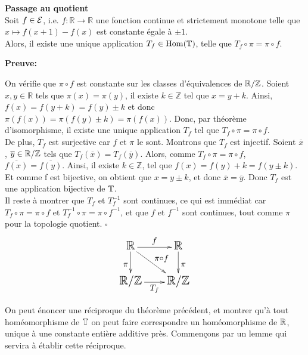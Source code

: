 \begin{theorem}\label{passage au quotient}
	 \textbf{Passage au quotient}\\Soit $f\in {\mathcal{E}}$, i.e. $f: \mathbb{R} \to \mathbb{R}$ une fonction continue et strictement monotone telle que $x\mapsto f(x+1) -f(x)$ est constante égale à $\pm 1$.\\ Alors, il existe une unique application $T_f \in \mathrm{Hom}({\mathbb{T}})$, telle que $T_f\circ \pi = \pi \circ f$.
\end{theorem}

	\textbf{Preuve:}
	\par On vérifie que $\pi \circ f$ est constante sur les classes d'équivalences de ${\mathbb{R}}/\mathbb{Z}$. Soient $x,y \in \mathbb{R}$ tels que $\pi(x)= \pi(y)$, il existe $k \in \mathbb{Z}$ tel que $x= y +k$. Ainsi, $f(x)=f(y+k)=f(y)\pm k$ et donc $\pi(f(x))=\pi(f(y)\pm k)=\pi(f(x))$. Donc, par théorème d'isomorphisme, il existe une unique application $T_f$ tel que $T_f\circ \pi =\pi \circ f$.\\

	De plus, $T_f$ est surjective car $f$ et $\pi$ le sont. Montrons que $T_f$ est injectif. Soient $\overline{x}$, $\overline{y} \in {\mathbb{R}}/\mathbb{Z}$ tels que $T_f(\overline{x})= T_f(\overline{y})$. Alors, comme $T_f\circ \pi =\pi \circ f$, $\overline{f(x)}=\overline{f(y)}$. Ainsi, il existe $k \in \mathbb{Z}$, tel que $f(x)=f(y)+k=f(y\pm k)$. Et comme f est bijective, on obtient que $x=y\pm k$, et donc $\overline{x}=\overline{y}$. Donc $T_f$ est une application bijective de ${\mathbb{T}}$.\\

	Il reste à montrer que $T_f$ et $T_f^{-1}$ sont continues, ce qui est immédiat car $T_f\circ\pi=\pi \circ f$ et $T_f^{-1}\circ\pi=\pi\circ f^{-1}$, et que $f$ et $f^{-1}$ sont continues, tout comme $\pi$ pour la topologie quotient. \hfill $\square$\\

$$\Large\xymatrix{\Rbb \ar[r]^f \ar[dr]^{\pi\circ f}\ar[d]_\pi &\Rbb \ar[d]^\pi\\
\EnsembleQuotient{\Rbb}{\Zbb} \ar[r]_{T_f}&\EnsembleQuotient{\Rbb}{\Zbb}}$$


\vspace{8mm}



On peut énoncer une réciproque du théorème précédent, et montrer qu'à tout homéomorphisme de ${\mathbb{T}}$ on peut faire correspondre un homéomorphisme de ${\mathbb{R}}$, unique à une constante entière additive près. Commençons par un lemme qui servira à établir cette réciproque.\\

